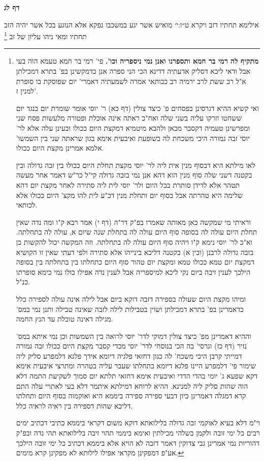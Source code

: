 \documentclass[12pt, openany]{book}
\newcommand{\sethebfont}{
\fontsize{10.5pt}{21.0pt} \selectfont
}
\newcommand{\twocol}[1]{
	{\sethebfont \begin{multicols}{2}
			#1
	\end{multicols}}	
}
\newcommand{\sectname}{}
\newcommand{\newsection}[1]{
	\addcontentsline{toc}{section}{#1}
	\renewcommand{\sectname}{#1}	
	\vspace{-\baselineskip}
	\begin{center}
		\textbf{%
\fontsize{16pt}{16pt}\selectfont
			#1}
	\end{center}
	\vspace{-\baselineskip}
	\nopagebreak
}
\newcommand{\footnotecomment}[1]{\footnote{#1}}
\newcommand{\commenta}[1]{\footnotecomment{#1}}
\begin{document}
\newsection{דף לג}
\twocol{אילימא תחתיו דזב {ויקרא ט״ו:י׳ } מואיש אשר יגע במשכבו נפקא אלא הנוגע בכל אשר יהיה הזב תחתיו ומאי ניהו עליון של זב
\commenta{\textbf{מתקיף לה רמי בר חמא ותספרנו ואנן נמי ניספריה וכו'.}  פי' רמי בר חמא טעמא הוה בעי אבל ודאי ליכא דסליק אדעתיה דדינא הכי הני ספרה אנן כדמקשינן בפ' בתרא דמכילתן א"ל רב ששת לרב ירמיה רב ככותאי אמרה לשמעתיה דאמרי' יום שפוסקת בו סופרת למנין ז'.\par  ואי קשיא ההיא דגרסינן בפסחים פ' כיצד צולין (דף כא) ר' יוסי אומר שומרת יום כנגד יום ששחטו וזרקו עליה בשני שלה ואח"כ ראתה אינה אוכלת ופטורה מלעשות פסח שני ומפרשינן טעמיה דקסבר מכאן ולהבא מיטמיא דמקצת היום ככולו ובעינן עלה אלא לר' יוסי זבה גמורה היכי משכחת לה בשופעת ואיבעית אימא בגון שראתה שני בין השמשו' אלמא אמרינן מקצת היום ככולו.\par לאו מילתא היא דבסוף מנין אית ליה לר' יוסי מקצת תחלת היום ככולו בין זבה גדולה ובין בקטנה דשני שלה סוף מנין הוא דהא אנן נמי בזבה גדולה קי"ל כר"ש דאמר אחר מעשה תטהר אלא לדידן סותרת בכל היום ולר' יוסי לית ליה סתירה לאחר מקצת יום דהא שלימה היא טהרתה אבל בסוף יום ותחלת מנין דכ"ע לית להו מקצ' היום ככולו אלא לכותאי.\par וראיתי מי שמקשה כאן מאותה שאמרו בפ"ק דר"ה (דף י) אמר רבא ק"ו ומה נדה שאין תחלת היום עולה לה בסופה סוף היום עולה לה בתחלת שנה שיום א, עולה לה בתחלתה. וא"כ לר' יוסי נימא ק"ו ויהיה סוף היום עולה לה בתחלתה. וזה המקשה יכול להקשות כן בזבה גדולה לרבנן (ובין א) בקטנה דליכא בינייהו אלא סתירה ולפי דעתי שאין זו הקושיא דמקצת יום טמא ככולו טמא ומקצת יום טהור סוף היום כתחלתו בין בתחלתה בין בסופה הילכך לענין זיבה ביום נקי ליכא למיספריה אבל לענין נדה אפילו כולו נמי כימא סופרתו כנ"ל.\par  ומיהו מקצת היום שעולה בספירה דזבה דוקא ביום אבל לילה אינה עולה לספירה כלל כדאמרינן בפ' בתרא דמכילתן ושוין בטבילות לילה לזבה שאינה טבילה ותנן נמי במס' מגילה דאינה טובלת עד הנץ החמה.\par וההיא דאמרינן מפ' כיצד צולין דמוקי לדר' יוסי לרואה בין השמשות וכן נמי איתא במס' נזיר (דף כז) וגרסי' בה הכי בנוסחי לדר' יוסי מכדי קסבר מקצת היום ככולו זבה גמורה דמייתי קרבן היכי משכח' לה כגון דחזאי פלגיה דיומא אידך פלגא דלמפרע סליק ליה שימור פי' דלמפרע היינו פלגא דיומא בתחלתו שעבר עליה בטהרה ומתרצי איבעית אימא דקא שפעא ג' יומי בהדי הדדי ואיבעית אימא דחזאי תלתא יום סמוך לשקיעת התמה דלא הוה שהות סליק ליה למנינא. ההיא לרוחא דמילתא איתמר דלא בעי לאתויי עלה התם קרא דמגלה דאמרינן כיון דבעי ספירה ספירה ביממא היא ואוקמוה בסוף היום ותחלתו דליכא שהות דספירה בין ראיה לראיה כלל.\par וי"מ דלא בעיא לאוקמי זבה גדולה בלילואתא דוקא משום דקראי ביממא כתיבי דכתיב ימים רבים כל ימי זובה ולקמן בשלהי מכילתין ואימא ביממי תהוי זיבה בלילואתא תהי נדה ובפ"ק דהוריות נמי אמרינן גבי צדוקין דאמר דזבה לא הויא אלא ביממא דכתיב כל ימי זובה הילכך אע"פ דמפקינן מקראי אפילו לילותא לא מפקינן קרא מימים. }

}
\end{document}
